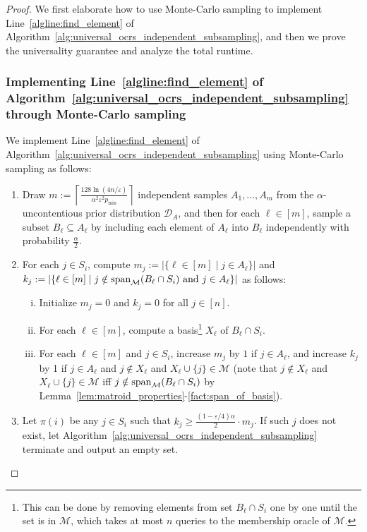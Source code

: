 \documentclass[11pt]{article}
\newcommand{\ceil}[1]{\left\lceil #1 \right\rceil}
\newcommand{\D}{\mathcal D}
\newcommand{\M}{{\mathcal M}}
\newcommand{\eps}{\varepsilon}
\newcommand{\spa}{\textnormal{span}}
\begin{document}
\begin{proof}
We first elaborate how to use Monte-Carlo sampling to implement Line~\ref{algline:find_element} of Algorithm~\ref{alg:universal_ocrs_independent_subsampling}, and then we prove the universality guarantee and analyze the total runtime.
\subsubsection*{Implementing Line~\ref{algline:find_element} of Algorithm~\ref{alg:universal_ocrs_independent_subsampling} through Monte-Carlo sampling}
We implement Line~\ref{algline:find_element} of Algorithm~\ref{alg:universal_ocrs_independent_subsampling} using Monte-Carlo sampling as follows:
\begin{enumerate}[(1)]
    \item Draw $m:=\ceil{\frac{128\ln(4n/\eps)}{\alpha^2\eps^2 p_{\min}}}$ independent samples $A_1,\dots,A_m$ from the $\alpha$-uncontentious prior distribution $\D_A$, and then for each $\ell\in[m]$, sample a subset $B_{\ell}\subseteq A_{\ell}$ by including each element of $A_{\ell}$ into $B_{\ell}$ independently with probability $\frac{\alpha}{2}$.
    \item For each $j\in S_i$, compute $m_j:=|\{\ell\in[m] \mid j\in A_{\ell}\}|$ and $k_j:=|\{\ell\in[m]\mid j\notin \spa_{\M}(B_{\ell}\cap S_i) \textrm{ and } j\in A_{\ell}\}|$ as follows:
    \begin{enumerate}[(i)]
        \item Initialize $m_j=0$ and $k_j=0$ for all $j\in[n]$.
        \item For each $\ell\in[m]$,  compute a basis\footnote{This can be done by removing elements from set $B_{\ell}\cap S_i$ one by one until the set is in $\M$, which takes at most $n$ queries to the membership oracle of $\M$.} $X_{\ell}$ of $B_{\ell}\cap S_i$.
        \item For each $\ell\in[m]$ and $j\in S_i$, increase $m_j$ by $1$ if $j\in A_{\ell}$, and increase $k_j$ by 1 if $j\in A_{\ell}$ and $j\notin X_{\ell}$ and $X_{\ell}\cup\{j\}\in\M$ (note that $j\notin X_{\ell}$ and $X_{\ell}\cup\{j\}\in\M$ iff $j\notin \spa_{\M}(B_{\ell}\cap S_i)$ by Lemma~\ref{lem:matroid_properties}-\ref{fact:span_of_basis}).
    \end{enumerate}
    \item\label{step:find_element} Let $\pi(i)$ be any $j\in S_i$ such that $k_j\ge\frac{(1-\eps/4)\alpha}{2}\cdot m_j$. If such $j$ does not exist, let Algorithm~\ref{alg:universal_ocrs_independent_subsampling} terminate and output an empty set.

\end{enumerate}
\end{proof}
\end{document}
